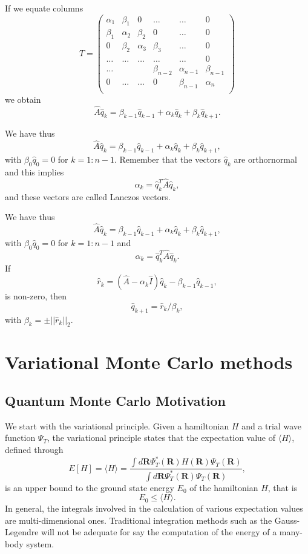 \documentclass[%
oneside,                 %
final,                   %
10pt]{article}
\begin{document}
If we equate columns 
\[
\hat{T} = \left(\begin{array}{cccccc}
        \alpha_1& \beta_1 & 0 &\dots   & \dots &0 \\
        \beta_1 & \alpha_2 & \beta_2 &0 &\dots &0 \\
        0& \beta_2 & \alpha_3 & \beta_3 & \dots &0 \\
        \dots& \dots   & \dots &\dots   &\dots & 0 \\
        \dots&   &  &\beta_{n-2}  &\alpha_{n-1}& \beta_{n-1} \\
        0&  \dots  &\dots  &0   &\beta_{n-1} & \alpha_{n} \\
        \end{array} \right)
\]
we obtain
\[
\hat{A}\hat{q}_k=\beta_{k-1}\hat{q}_{k-1}+\alpha_k\hat{q}_k+\beta_k\hat{q}_{k+1}.
\]

We have thus
\[
\hat{A}\hat{q}_k=\beta_{k-1}\hat{q}_{k-1}+\alpha_k\hat{q}_k+\beta_k\hat{q}_{k+1},
\]
with $\beta_0\hat{q}_0=0$ for $k=1:n-1$. Remember that the vectors $\hat{q}_k$  are orthornormal and this implies
\[
\alpha_k=\hat{q}_k^T\hat{A}\hat{q}_k,
\]
and these vectors are called Lanczos vectors.

We have thus
\[
\hat{A}\hat{q}_k=\beta_{k-1}\hat{q}_{k-1}+\alpha_k\hat{q}_k+\beta_k\hat{q}_{k+1},
\]
with $\beta_0\hat{q}_0=0$ for $k=1:n-1$ and 
\[
\alpha_k=\hat{q}_k^T\hat{A}\hat{q}_k.
\]
If 
\[
\hat{r}_k=(\hat{A}-\alpha_k\hat{I})\hat{q}_k-\beta_{k-1}\hat{q}_{k-1},
\]
is non-zero, then 
\[
\hat{q}_{k+1}=\hat{r}_{k}/\beta_k,
\]
with $\beta_k=\pm ||\hat{r}_{k}||_2$.

\section*{Variational Monte Carlo methods}

\subsection*{Quantum Monte Carlo Motivation}

We start with the variational principle.
Given a hamiltonian $H$ and a trial wave function $\Psi_T$, the variational principle states that the expectation value of $\langle H \rangle$, defined through 
\[
   E[H]= \langle H \rangle =
   \frac{\int d\bm{R}\Psi^{\ast}_T(\bm{R})H(\bm{R})\Psi_T(\bm{R})}
        {\int d\bm{R}\Psi^{\ast}_T(\bm{R})\Psi_T(\bm{R})},
\]
is an upper bound to the ground state energy $E_0$ of the hamiltonian $H$, that is 
\[
    E_0 \le \langle H \rangle .
\]
In general, the integrals involved in the calculation of various  expectation values  are multi-dimensional ones. Traditional integration methods such as the Gauss-Legendre will not be adequate for say the  computation of the energy of a many-body system.
\end{document}
